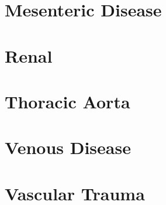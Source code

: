 \documentclass[
]{book}
\begin{document}
\hypertarget{mesenteric-disease}{%
\chapter{Mesenteric Disease}\label{mesenteric-disease}}

\hypertarget{section-2}{%
\section{}\label{section-2}}

\hypertarget{renal}{%
\chapter{Renal}\label{renal}}

\hypertarget{section-3}{%
\section{}\label{section-3}}

\hypertarget{thoracic-aorta}{%
\chapter{Thoracic Aorta}\label{thoracic-aorta}}

\hypertarget{section-4}{%
\section{}\label{section-4}}

\hypertarget{venous-disease}{%
\chapter{Venous Disease}\label{venous-disease}}

\hypertarget{section-5}{%
\section{}\label{section-5}}

\hypertarget{vascular-trauma}{%
\chapter{Vascular Trauma}\label{vascular-trauma}}

\hypertarget{section-6}{%
\section{}\label{section-6}}
\end{document}
